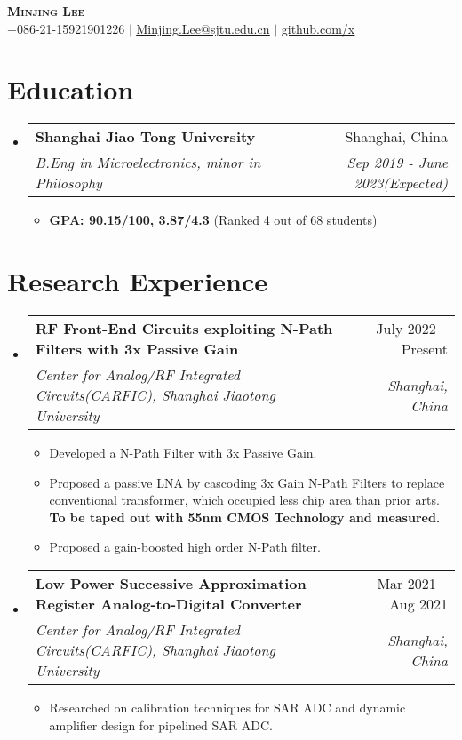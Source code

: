 \documentclass[letterpaper,11pt]{article}
\makeatletter
\newcommand{\resumeItem}[1]{
  \item\small{
    {#1 \vspace{-2pt}}
  }
}
\newcommand{\resumeSubheading}[4]{
  \vspace{-2pt}\item
    \begin{tabular*}{0.97\textwidth}[t]{l@{\extracolsep{\fill}}r}
      \textbf{#1} & #2 \\
      \textit{\small#3} & \textit{\small #4} \\
    \end{tabular*}\vspace{-7pt}
}
\newcommand{\resumeSubHeadingListStart}{\begin{itemize}[leftmargin=0.15in, label={}]}
\newcommand{\resumeSubHeadingListEnd}{\end{itemize}}
\newcommand{\resumeItemListStart}{\begin{itemize}}
\newcommand{\resumeItemListEnd}{\end{itemize}\vspace{-5pt}}
\makeatother
\begin{document}


\begin{center}
    \textbf{\Huge \scshape Minjing Lee} \\ \vspace{1pt}
    \small +086-21-15921901226 $|$ \href{mailto:Minjing.Lee@sjtu.edu.cn}{\underline{Minjing.Lee@sjtu.edu.cn}} $|$ 
    \href{https://github.com/x}{\underline{github.com/x}}
\end{center}


\section{Education}
  \resumeSubHeadingListStart
    \resumeSubheading
      {Shanghai Jiao Tong University}{Shanghai, China}
      {B.Eng in Microelectronics, minor in Philosophy}{Sep 2019 - June 2023(Expected)}
          \resumeItemListStart
            \resumeItem{\textbf{GPA: 90.15/100, 3.87/4.3 }(Ranked 4 out of 68 students)}
        \resumeItemListEnd
  \resumeSubHeadingListEnd

\section{Research Experience}
  \resumeSubHeadingListStart
    
    \resumeSubheading
      {RF Front-End Circuits exploiting N-Path Filters with 3x Passive Gain}{July 2022 – Present}
      {Center for Analog/RF Integrated Circuits(CARFIC), Shanghai Jiaotong University}{Shanghai, China}
      \resumeItemListStart
         \resumeItem{Developed a N-Path Filter with 3x Passive Gain.}
        \resumeItem{Proposed a passive LNA by cascoding 3x Gain N-Path Filters to replace conventional transformer, which occupied less chip area than prior arts. \textbf{To be taped out with 55nm CMOS Technology and measured.}}
        \resumeItem{Proposed a gain-boosted high order N-Path filter.}
      \resumeItemListEnd
    \resumeSubheading
      {Low Power Successive Approximation Register Analog-to-Digital Converter}{Mar 2021 – Aug 2021}
      {Center for Analog/RF Integrated Circuits(CARFIC), Shanghai Jiaotong University}{Shanghai, China}
      \resumeItemListStart
        \resumeItem{Researched on calibration techniques for SAR ADC and dynamic amplifier design for pipelined SAR ADC.}
      \resumeItemListEnd  
     
    \resumeSubHeadingListEnd
\end{document}
